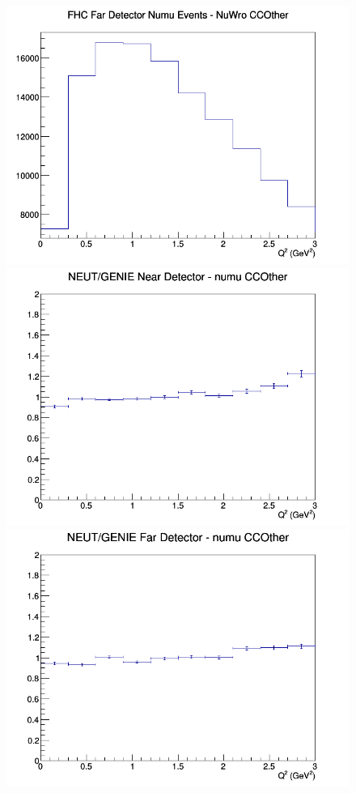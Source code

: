 \begin{figure}[h]
\endminipage
{}
\includegraphics[width=\linewidth]{Q2/nominal/CCOther_FHC_FD_numu_Q2_NuWro.png}
\endminipage
\newline
{}
\includegraphics[width=\linewidth]{Q2/nominal/ratios/CCOther_NEUT_GENIE_numu_near_Q2.png}
\endminipage
{}
\includegraphics[width=\linewidth]{Q2/nominal/ratios/CCOther_NEUT_GENIE_numu_far_Q2.png}

\end{figure}
